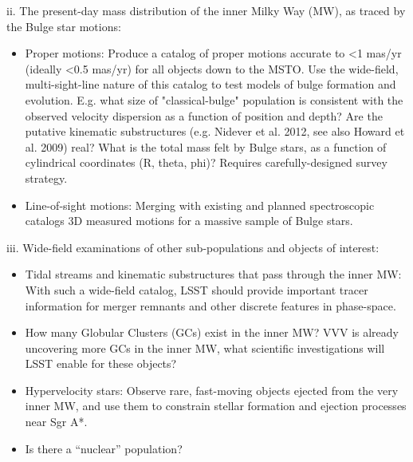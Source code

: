 ii. The present-day mass distribution of the inner Milky Way (MW), as traced by the Bulge star motions: 
\begin{itemize}
\item{Proper motions: Produce a catalog of proper motions accurate to <1 mas/yr (ideally <0.5 mas/yr) for all 
objects down to the MSTO. Use the wide-field, multi-sight-line nature of this catalog to test models of bulge formation and evolution. E.g. what size of "classical-bulge" population is consistent with the observed velocity dispersion as a function of position and depth? Are the putative kinematic substructures (e.g. Nidever et al. 2012, see also Howard et al. 2009) real? What is the total mass felt by Bulge stars, as a function of cylindrical coordinates (R, theta, phi)? Requires carefully-designed survey strategy. }
\item{Line-of-sight motions: Merging with existing and planned spectroscopic catalogs 3D measured motions for a massive sample of Bulge stars.}
\end{itemize}

iii. Wide-field examinations of other sub-populations and objects of interest: 
\begin{itemize}
\item{Tidal streams and kinematic substructures that pass through the inner MW: With such a wide-field catalog, 
LSST should provide important tracer information for merger remnants and other discrete features in 
phase-space.}
\item{How many Globular Clusters (GCs) exist in the inner MW? VVV is already uncovering more GCs in the inner 
MW, what scientific investigations will LSST enable for these objects? }
\item{
Hypervelocity stars: Observe rare, fast-moving objects ejected from the very inner MW, and use them to 
constrain stellar formation and ejection processes near Sgr A*. }
\item{Is there a “nuclear” population? }
\end{itemize}


